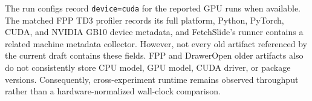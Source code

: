 \documentclass[letterpaper]{article}
\begin{document}
The run configs record \texttt{device=cuda} for the reported GPU runs when available. The matched FPP TD3 profiler records its full platform, Python, PyTorch, CUDA, and NVIDIA GB10 device metadata, and FetchSlide's runner contains a related machine metadata collector. However, not every old artifact referenced by the current draft contains these fields. FPP and DrawerOpen older artifacts also do not consistently store CPU model, GPU model, CUDA driver, or package versions. Consequently, cross-experiment runtime remains observed throughput rather than a hardware-normalized wall-clock comparison.

\makeatletter
{}
\makeatother

\end{document}
